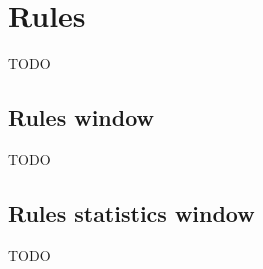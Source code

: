 \section{Rules}\label{section:rules}

TODO

\subsection{Rules window}\label{sub:rules}

TODO

\subsection{Rules statistics window}\label{sub:rule-stat}

TODO

\vfill\newpage